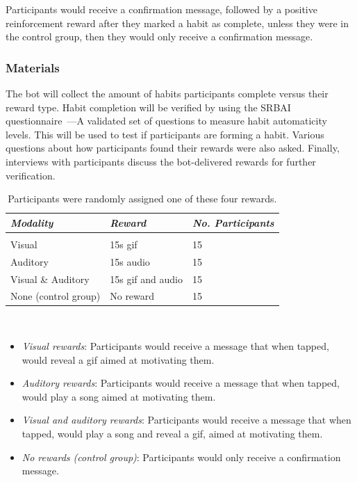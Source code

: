 Participants would receive a confirmation message, followed by a positive reinforcement reward after they marked a habit as complete, unless they were in the control group, then they would only receive a confirmation message.


\subsubsection{Materials}
The bot will collect the amount of habits participants complete versus their reward type. Habit completion will be verified by using the SRBAI questionnaire~\cite{article_4q_SRBAI}---A validated set of questions to measure habit automaticity levels. This will be used to test if participants are forming a habit. Various questions about how participants found their rewards were also asked. Finally, interviews with participants discuss the bot-delivered rewards for further verification.

\begin{table}
  \centering
  \begin{tabular}{l l l}
    {\small\textit{Modality}} & {\small \textit{Reward}} & {\small \textit{No. Participants}}\\
    \hline \\
    Visual & 15s gif & 15 \\
    Auditory & 15s audio & 15 \\
    Visual \& Auditory & 15s gif and audio & 15 \\
    None (control group) & No reward & 15 \\
  \end{tabular}
  \caption{Participants were randomly assigned one of these four rewards.}~\label{fig:precise_rewards}
\end{table}


\begin{itemize}
\item \textit{Visual rewards}: Participants would receive a message that when tapped, would reveal a gif aimed at motivating them.
\item \textit{Auditory rewards}: Participants would receive a message that when tapped, would play a song aimed at motivating them.
\item \textit{Visual and auditory rewards}: Participants would receive a message that when tapped, would play a song and reveal a gif, aimed at motivating them.
\item \textit{No rewards (control group)}: Participants would only receive a confirmation message.
\end{itemize}

